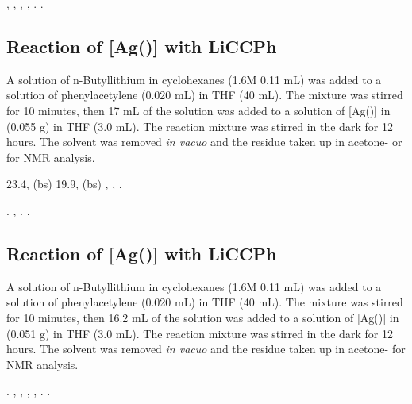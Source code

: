 ,
,
,
,
.
.

\subsection*{Reaction of \texorpdfstring{[Ag(\tButhixantphos)]} A with LiCCPh}

A solution of n-Butyllithium in cyclohexanes (1.6M 0.11 mL) was added to a solution of phenylacetylene (0.020 mL) in THF (40 mL).  The mixture was stirred for 10 minutes, then 17 mL of the solution was added to a solution of [Ag(\tButhixantphos)] in (0.055 g) in THF (3.0 mL).  The reaction mixture was stirred in the dark for 12 hours.  The solvent was removed \emph{in vacuo} and the residue taken up in acetone- or  for NMR analysis.   

23.4, (bs)
19.9, (bs)
,
,
.

.
,
.
.

\subsection*{Reaction of \texorpdfstring{[Ag(\tBuxantphos)]} A with LiCCPh}

A solution of n-Butyllithium in cyclohexanes (1.6M 0.11 mL) was added to a solution of phenylacetylene (0.020 mL) in THF (40 mL).  The mixture was stirred for 10 minutes, then 16.2 mL of the solution was added to a solution of [Ag(\tBuxantphos)] in (0.051 g) in THF (3.0 mL).  The reaction mixture was stirred in the dark for 12 hours.  The solvent was removed \emph{in vacuo} and the residue taken up in acetone- for NMR analysis.   

.
,
,
,
,
.
.

